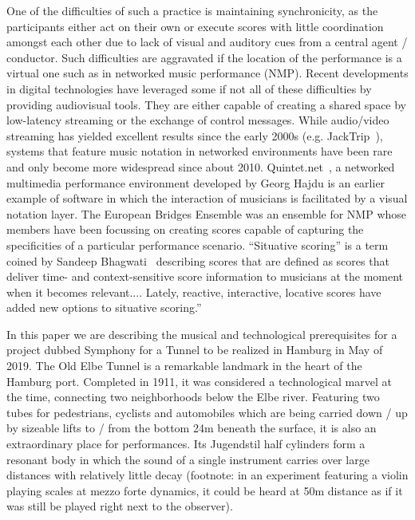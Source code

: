 One of the difficulties of such a practice is maintaining synchronicity, as the participants either act on their own or execute scores with little coordination amongst each other due to lack of visual and auditory cues from a central agent / conductor. Such difficulties are aggravated if the location of the performance is a virtual one such as in networked music performance (NMP). Recent developments in digital technologies have leveraged some if not all of these difficulties by providing audiovisual tools. They are either capable of creating a shared space by low-latency streaming or the exchange of control messages. While audio/video streaming has yielded excellent results since the early 2000s  (e.g. JackTrip~\cite{caceres2010jacktrip}), systems that feature music notation in networked environments have been rare and only become more widespread since about 2010. Quintet.net~\cite{hajdu2005quintet}, a networked multimedia performance environment developed by Georg Hajdu is an earlier example of software in which the interaction of musicians is facilitated by a visual notation layer. The European Bridges Ensemble was an ensemble for NMP whose members have been  focussing on creating scores capable of capturing the specificities of a particular performance scenario. ``Situative scoring'' is a term coined by Sandeep Bhagwati~\cite{bhagwati2017vexations} describing scores that are defined as scores that deliver time- and context-sensitive score information to musicians at the moment when it becomes relevant.... Lately, reactive, interactive, locative scores have added new options to situative scoring.''

In this paper we are describing the musical and technological prerequisites for a project dubbed Symphony for a Tunnel to be realized in Hamburg in May of 2019. The Old Elbe Tunnel is a remarkable landmark in the heart of the Hamburg port. Completed in 1911, it was considered a technological marvel at the time, connecting two neighborhoods below the Elbe river. Featuring two tubes for pedestrians, cyclists and automobiles which are being carried down / up by sizeable lifts to / from the bottom 24m beneath the surface, it is also an extraordinary place for performances. Its Jugendstil half cylinders form a resonant body in which the sound of a single instrument carries over large distances with relatively little decay (footnote: in an experiment featuring a violin playing scales at mezzo forte dynamics, it could be heard at 50m distance as if it was still be played right next to the observer).

